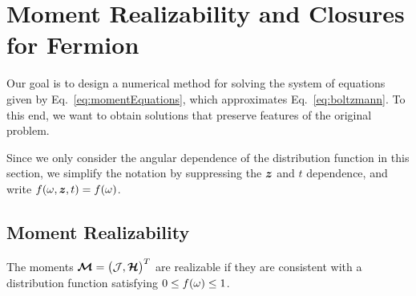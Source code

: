\section{Moment Realizability and Closures for Fermion}
\label{sec:realizability}

Our goal is to design a numerical method for solving the system of equations given by Eq.~\eqref{eq:momentEquations}, which approximates Eq.~\eqref{eq:boltzmann}.  
To this end, we want to obtain solutions that preserve features of the original problem. 

Since we only consider the angular dependence of the distribution function in this section, we simplify the notation by suppressing the $\boldsymbol{z}$ and $t$ dependence, and write $f(\omega,\boldsymbol{z},t)=f(\omega)$.  

\subsection{Moment Realizability}

\begin{define}
  The moments $\boldsymbol{\mathcal{M}}=\big(\mathcal{J},\boldsymbol{\mathcal{H}}\big)^{T}$ are realizable if they are consistent with a distribution function satisfying $0\le f(\omega) \le 1$.
\end{define}

